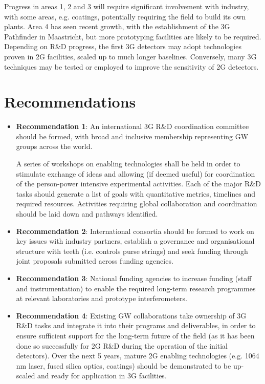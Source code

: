 \noindent Progress in areas 1, 2 and 3 will require significant involvement with industry, with some areas, e.g. coatings,  potentially requiring the field to build its own plants. Area 4 has seen recent growth, with the establishment of the 3G Pathfinder in Maastricht, but more prototyping facilities are likely to be required. Depending on R\&D progress, the first 3G detectors may adopt technologies proven in 2G facilities, scaled up to much longer baselines. Conversely, many 3G techniques may be tested or employed to improve the sensitivity of 2G detectors. 

\section*{Recommendations}
\begin{itemize}
\item \textbf{Recommendation 1}:  An international 3G R\&D coordination committee should be formed, with broad and inclusive membership representing GW groups across the world.

 A series of workshops on enabling technologies shall be held in order to stimulate exchange of ideas and allowing (if deemed useful) for coordination of the person-power intensive experimental activities.  Each of the major R\&D tasks should generate a list of  goals with quantitative metrics,  timelines and required resources.   Activities requiring global collaboration and coordination should be laid down and pathways identified.

\item \textbf{Recommendation 2}:  International consortia should be formed to work on key issues with industry partners, establish a governance and organisational structure with teeth (i.e. controls purse strings) and seek funding through joint proposals submitted across funding agencies.
\pagebreak
\item \textbf{Recommendation 3}: National funding agencies to increase funding (staff and instrumentation)   to enable the required long-term research programmes at relevant laboratories and prototype interferometers.

\item \textbf{Recommendation 4}: Existing GW collaborations take ownership of 3G R\&D tasks and integrate it into their programs and deliverables, in order to ensure sufficient support for the long-term future of the field (as it has been done so successfully for 2G R\&D during the operation of the initial detectors). Over the next 5 years, mature 2G enabling technologies (e.g. 1064\,nm laser, fused silica optics, coatings) should be demonstrated to be up-scaled and ready for application in 3G facilities.

\end{itemize}

